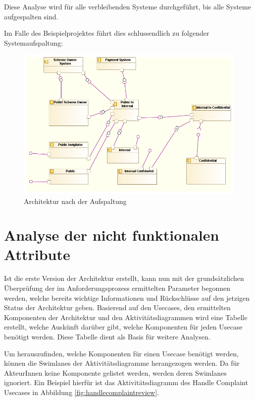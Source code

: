 Diese Analyse wird für alle verbleibenden Systeme durchgeführt, bis alle Systeme aufgespalten sind.

Im Falle des Beispielprojektes führt dies schlussendlich zu folgender Systemaufspaltung:

\begin{figure}[H]
    \centering
    \includegraphics[scale=0.6]{uml/vision4.png}
    \caption{Architektur nach der Aufspaltung }
\end{figure}

\section{Analyse der nicht funktionalen Attribute}
Ist die erste Version der Architektur erstellt, kann nun mit der grundsätzlichen Überprüfung der im Anforderungsprozess ermittelten Parameter begonnen werden, welche bereits wichtige Informationen und Rückschlüsse auf den jetzigen Status der Architektur geben. Basierend auf den Usecases, den ermittelten Komponenten der Architektur und den Aktivitätsdiagrammen wird eine Tabelle erstellt, welche Auskünft darüber gibt, welche Komponenten für jeden Usecase benötigt werden. Diese Tabelle dient als Basis für weitere Analysen.

Um herauszufinden, welche Komponenten für einen Usecase benötigt werden, können die Swimlanes der Aktivitätsdiagramme herangezogen werden. Da für AkteurInnen keine Komponente gelistet werden, werden deren Swimlanes ignoriert. Ein Beispiel hierfür ist das Aktivitätsdiagramm des Handle Complaint Usecases in Abbildung \ref{fig:handlecomplaintreview}.


